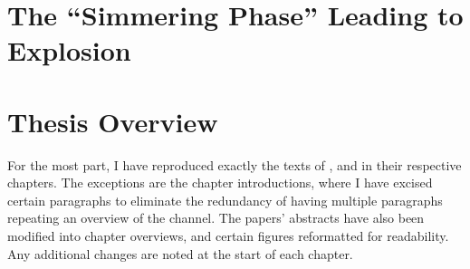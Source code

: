 \section{The ``Simmering Phase'' Leading to Explosion}

\section{Thesis Overview}

For the most part, I have reproduced exactly the texts of \citeal{zhu+13}, \citeal{zhu+15} and \citeal{zhu+16} in their respective chapters.  The exceptions are the chapter introductions, where I have excised certain paragraphs to eliminate the redundancy of having multiple paragraphs repeating an overview of the \citeal{vkercj10} channel.  The papers' abstracts have also been modified into chapter overviews, and certain figures reformatted for readability.  Any additional changes are noted at the start of each chapter.
